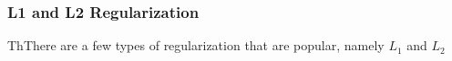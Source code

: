 \subsubsection{L1 and L2 Regularization}

ThThere are a few types of regularization that are popular, namely $L_1$ and $L_2$